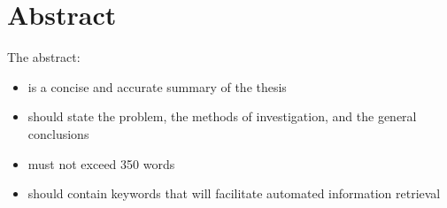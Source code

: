 
\chapter{Abstract}

The abstract:
\begin{itemize}
  \item is a concise and accurate summary of the thesis
  \item should state the problem, the methods of investigation, and the general conclusions
  \item must not exceed 350 words
  \item should contain keywords that will facilitate automated information retrieval
\end{itemize}
